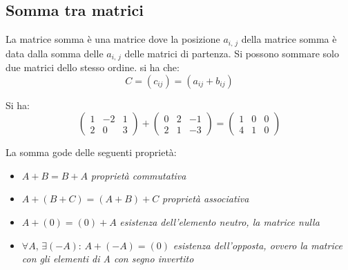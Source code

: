 \documentclass[a4paper,12pt, oneside]{book}
\begin{document}
\subsection{Somma tra matrici}
La matrice somma è una matrice dove la posizione $a_{i,\,j}$ della matrice somma è data dalla somma delle $a_{i,\,j}$ delle matrici di partenza. Si possono sommare solo due matrici dello stesso ordine. si ha che:
$$C=(c_{ij})=(a_{ij}+b_{ij})$$
\begin{esempio}
	Si ha:\\
	$$\left(\begin{matrix}
			1 & -2 & 1 \\
			2 & 0  & 3
		\end{matrix}\right)+\left(\begin{matrix}
			0 & 2 & -1 \\
			2 & 1 & -3
		\end{matrix}\right)=\left(\begin{matrix}
			1 & 0 & 0 \\
			4 & 1 & 0
		\end{matrix}\right)$$
\end{esempio}
La somma gode delle seguenti proprietà:
\begin{itemize}
	\item $A+B=B+A$ \textit{proprietà commutativa}
	\item $A+(B+C)=(A+B)+C$ \textit{proprietà associativa}
	\item $A+(0)=(0)+A$ \textit{esistenza dell'elemento neutro, la matrice nulla}
	\item $\forall A,\, \exists (-A):\, A+(-A)=(0)$ \textit{esistenza dell'opposta, ovvero la matrice con gli elementi di A con segno invertito}
\end{itemize}
\newpage
\end{document}
